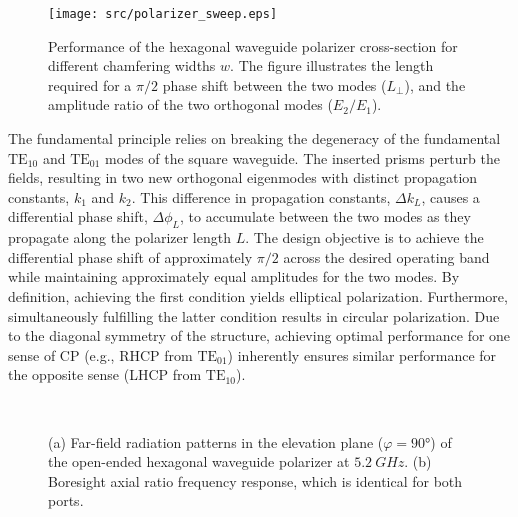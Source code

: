\documentclass[journal]{IEEEtran}
\newcommand{\TE}[2]{\text{TE}_{#1#2}}
\begin{document}
\begin{figure}[!b]
    \centering
    \texttt{[image: src/polarizer\_sweep.eps]}
    \caption{\label{fig:polarizer-sweep}Performance of the hexagonal waveguide polarizer cross-section for different chamfering widths $w$. The figure illustrates the length required for a $\pi/2$ phase shift between the two modes ($L_\perp$), and the amplitude ratio of the two orthogonal modes ($E_2/E_1$).}
\end{figure}

The fundamental principle relies on breaking the degeneracy of the fundamental $\TE 10$ and $\TE 01$ modes of the square waveguide. The inserted prisms perturb the fields, resulting in two new orthogonal eigenmodes with distinct propagation constants, $k_1$ and $k_2$. This difference in propagation constants, $\Delta k_L$, causes a differential phase shift, $\Delta\phi_L$, to accumulate between the two modes as they propagate along the polarizer length $L$. The design objective is to achieve the differential phase shift of approximately $\pi/2$ across the desired operating band while maintaining approximately equal amplitudes for the two modes. By definition, achieving the first condition yields elliptical polarization. Furthermore, simultaneously fulfilling the latter condition results in circular polarization. Due to the diagonal symmetry of the structure, achieving optimal performance for one sense of CP (e.g., RHCP from $\TE 01$) inherently ensures similar performance for the opposite sense (LHCP from $\TE 10$).

\begin{figure}[!b]
    \centering
    \\
    \caption{\label{fig:polarizer-radiation}(a) Far-field radiation patterns in the elevation plane ($\varphi=\ang{90}$) of the open-ended hexagonal waveguide polarizer at $\qty{5.2}{GHz}$. (b) Boresight axial ratio frequency response, which is identical for both ports.}
\end{figure}
\end{document}
